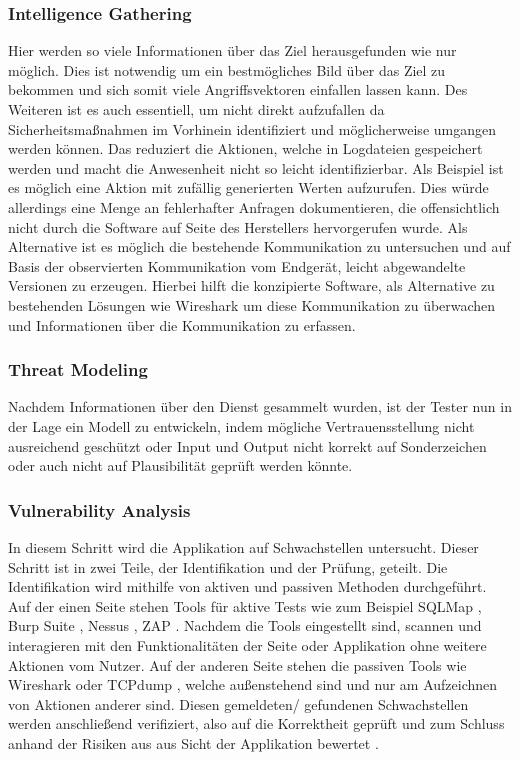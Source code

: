     \subsubsection{\glqq Intelligence Gathering\grqq{}}
        Hier werden so viele Informationen über das Ziel herausgefunden wie nur möglich. Dies ist notwendig um ein bestmögliches Bild über das Ziel zu bekommen und sich somit viele Angriffsvektoren einfallen lassen kann. Des Weiteren ist es auch essentiell, um nicht direkt aufzufallen da Sicherheitsmaßnahmen im Vorhinein identifiziert und möglicherweise umgangen werden können. Das reduziert die Aktionen, welche in Logdateien gespeichert werden und macht die Anwesenheit nicht so leicht identifizierbar. Als Beispiel ist es möglich eine Aktion mit zufällig generierten Werten aufzurufen. Dies würde allerdings eine Menge an fehlerhafter Anfragen dokumentieren, die offensichtlich nicht durch die Software auf Seite des Herstellers hervorgerufen wurde. Als Alternative ist es möglich die bestehende Kommunikation zu untersuchen und auf Basis der observierten Kommunikation vom Endgerät, leicht abgewandelte Versionen zu erzeugen. Hierbei hilft die konzipierte Software, als Alternative zu bestehenden Lösungen wie Wireshark um diese Kommunikation zu überwachen und Informationen über die Kommunikation zu erfassen.
    \subsubsection{\glqq Threat Modeling\grqq{}}
        Nachdem Informationen über den Dienst gesammelt wurden, ist der Tester nun in der Lage ein Modell zu entwickeln, indem mögliche Vertrauensstellung nicht ausreichend geschützt oder Input und Output nicht korrekt auf Sonderzeichen oder auch nicht auf Plausibilität geprüft werden könnte. 
    \subsubsection{\glqq Vulnerability Analysis\grqq{}}
        In diesem Schritt wird die Applikation auf Schwachstellen untersucht. 
        Dieser Schritt ist in zwei Teile, der Identifikation und der Prüfung, geteilt.
        Die Identifikation wird mithilfe von aktiven und passiven Methoden durchgeführt.
        Auf der einen Seite stehen Tools für aktive Tests wie zum Beispiel 
        SQLMap \cite{damele_stampar_2014}, 
        Burp Suite \cite{LozanoCarlosA.author2019Hapt}, %
        Nessus \cite{BealeJay2008Nna}, %
        \ac{ZAP} \cite{bennetts2013owasp}. %
        Nachdem die Tools eingestellt sind, scannen und interagieren mit den Funktionalitäten der Seite oder Applikation ohne weitere Aktionen vom Nutzer.
        Auf der anderen Seite stehen die passiven Tools wie Wireshark oder TCPdump \cite{tcpdump_2010}, welche außenstehend sind und nur am Aufzeichnen von Aktionen anderer sind. 
        Diesen gemeldeten/ gefundenen Schwachstellen werden anschließend verifiziert, also auf die Korrektheit geprüft und zum Schluss anhand der Risiken aus aus Sicht der Applikation bewertet \cite{hayes_2012}.

